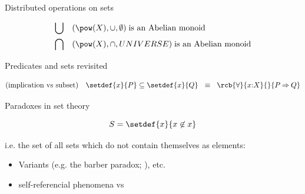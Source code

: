 \documentclass{beamer}
\def\dimp{\mathbin{\equiv}}
\def\imp{\mathbin{\Rightarrow}}
\begin{document}
\begin{slide}{Distributed operations on sets}

\begin{align*}
\text{$\bigcup$} && & (\pow(X), \cup,\emptyset )\; \text{is an Abelian monoid}\\
\text{$\bigcap$} && & (\pow(X),\cap,UNIVERSE)\; \text{is an Abelian monoid}\\
\end{align*}
\end{slide}

\begin{slide}{Predicates and sets revisited}


\vspace{1cm}

\begin{align*}
\text{(implication vs subset)} && & \setdef{x}{P} \subseteq  \setdef{x}{Q} ~~\dimp~~  \rcb{\forall}{x{:}X}{}{P \imp Q}\\
\end{align*}

\end{slide}



\begin{slide}{Paradoxes in set theory}

$$ S = \setdef{x}{x \not \in x}$$
\vspace{0.5cm}



i.e. the set of all sets which do not contain themselves as elements: \dkb{$S \in S \dimp S \not\in S$}

\vspace{1cm}

\begin{itemize}
\item Variants (e.g. the barber paradox; ), etc.
\item self-referencial phenomena vs 
\end{itemize}
\end{slide}
\end{document}
